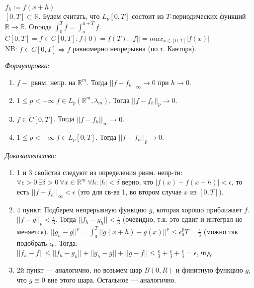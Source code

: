 \documentclass[paper=a4, fontsize=14pt]{report}
\begin{document}
    $f_h := f(x+h)$ \\
    $[0, T] \subset \mathbb{R}$. Будем считать, что $L_p[0, T]$ состоит из $T$-периодических функций $\mathbb{R} \rightarrow \overline {\mathbb{R}}$. Отсюда $\int_{0}^{T} f = \int_{a}^{a+T} f.$ \\
    $\widetilde{C}[0, T] = {f \in C[0, T]: f(0) = f(T) }. ||f|| = max_{x\in[0,T]}|f(x)|$ \\
    NB: $f \in \widetilde{C}[0, T] \Rightarrow f$ равномерно непрерывна (по т. Кантора).

    \emph{Формулировка}:
    \begin{enumerate}
        \item $f - $ рвнм. непр. на $\mathbb{R}^m$. Тогда $||f-f_h||_\infty \rightarrow 0$ при $h\rightarrow 0$.
        \item $1 \leq p < + \infty \ f \in L_p(\mathbb{R}^m, \lambda_m)$. Тогда $||f-f_h||_p \rightarrow 0$.
        \item $f \in \widetilde{C}[0, T]$. Тогда $||f-f_h||_\infty \rightarrow 0$.
        \item $1 \leq p < + \infty \  f \in L_p[0; T]$. Тогда $||f-f_h||_p \rightarrow 0$.
    \end{enumerate}
    
    
    \emph{Доказательство}:

\begin{enumerate}
	\item 1 и 3 свойства следуют из определения рвнм. непр-ти:
		$\forall \epsilon > 0 \ \exists \delta > 0 \  \forall x \in \mathbb{R}^m \ \forall h: |h| < \delta$ верно, что $|f(x) - f(x+h)| < \epsilon$, то есть $||f-f_h||_\infty < \epsilon$
		(это для св-ва 1, во втором случае $x$ из $[0,T]$).
	\item 4 пункт: Подберем непрерывную функцию $g$, которая хорошо приближает $f$. $||f - g||_p < \frac{\epsilon}{3}$. Тогда $||f_h - g_h|| < \frac{\epsilon}{3}$ (очевидно, т.к. это сдвиг и интеграл не меняется). $||g_h-g||^p = \int_{0}^{T} ||g(x+h) - g(x)||^p \leq \epsilon_0^p T = \frac{\epsilon}{3}$ (можно так подобрать $\epsilon_0$. Тогда:  $||f_h - f|| \leq ||f_h-g_h|| + ||g_h - g|| + ||g - f|| \leq \frac{\epsilon}{3} + \frac{\epsilon}{3} + \frac{\epsilon}{3} = \epsilon$, чтд.
	\item 2й пункт --- аналогично, но возьмем шар $B(0, R)$ и финитную функцию $g$, что $g \equiv 0$ вне этого шара. Остальное --- аналогично. 
\end{enumerate}
\end{document}
